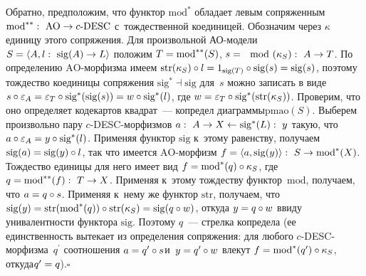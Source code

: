 \begin{multicols}{2}
 Обратно, предположим, что функтор $\mathrm{mod}^*$ обладает левым сопряженным
$\mathrm{mod}^{**}:\ \mathrm{AO}\hm\to c\mbox{-}\mathrm{DESC}$ с~тождественной коединицей.
Обозначим через $\kappa$ единицу этого сопряжения. Для произвольной
 АО-мо\-де\-ли $S\hm = \langle A, l:\ \mathrm{sig}(A) \hm\to L\rangle$ положим $T\hm =
\mathrm{mod}^{**}(S)$, $s \hm= \mod(\kappa_S):\ A \hm\to T$. По определению
 $\mathrm{AO}$-мор\-физ\-ма имеем $\mathrm{str}(\kappa_S) \circ l \hm= 1_{\mathrm{sig}(T)}\circ \mathrm{sig}(s) \hm=
\mathrm{sig}(s)$, поэтому тождество коединицы сопряжения $\mathrm{sig}^* \dashv \mathrm{sig}$ для~$s$
можно записать в виде $s \circ \varepsilon_A\hm = \varepsilon_{T}\circ
\mathrm{sig}^*(\mathrm{sig}(s)) \hm= w\circ \mathrm{sig}^*(l)$,\linebreak
 где $w\hm = \varepsilon_T\circ
\mathrm{sig}^*(\mathrm{str}(\kappa_S))$. Проверим, что оно определяет кодекартов
квад\-рат~---
копредел диаграммы\linebreak $\mathrm{pmao}(S)$. Выберем произвольно пару
 $c$-DESC-мор\-физ\-мов $a:\ A \hm\to X \leftarrow \mathrm{sig}^*(L):\ y$ такую, что
$a\circ \varepsilon_A\hm = y \circ \mathrm{sig}^*(l)$.
Применяя функтор $\mathrm{sig}$ к~этому\linebreak
равенству, получаем $\mathrm{sig}(a) \hm= \mathrm{sig}(y) \circ l$,
так что имеется %
 $\mathrm{AO}$-мор\-физм $f \hm= \langle a, \mathrm{sig}(y)\rangle:\ S \hm\to
 \mathrm{mod}^*(X)$.
Тождество единицы для него имеет вид $f \hm= \mathrm{mod}^*(q) \circ \kappa_S$, где
$q\hm = \mathrm{mod}^{**}(f):\ T \hm\to X$. Применяя к~этому тож\-де\-ст\-ву функтор~$\mathrm{mod}$,
получаем, что $a \hm= q \circ s$. Применяя к~нему же функтор $\mathrm{str}$,
получаем,
что $\mathrm{sig}(y) \hm= \mathrm{str}(\mathrm{mod}^*(q)) \circ \mathrm{str}(\kappa_S) \hm= \mathrm{sig}(q \circ w)$, откуда $y
\hm= q \circ w$ ввиду унивалентности функтора $\mathrm{sig}$. Поэтому $q$~--- стрелка
копредела (ее единственность вытекает из определения сопряжения: для
любого $c$-DESC-мор\-физ\-ма~$q^\prime$ соотношения $a\hm= q^\prime
\circ s$\linebreak и~$y \hm= q^\prime \circ w$ влекут $f \hm= \mathrm{mod}^*(q^\prime) \circ
\kappa_S$, откуда\linebreak $q^\prime \hm= q$).\hfill$\square$

 \begin{center}
 \mbox{%
 \epsfxsize=76.969mm
 }
 \end{center}




\end{multicols}
